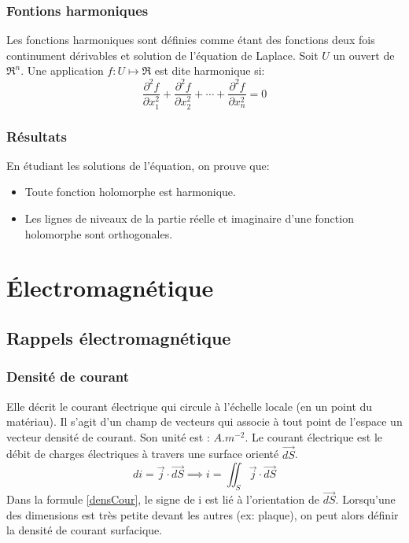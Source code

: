 \documentclass[10pt,a4paper]{article}
\begin{document}
\subsubsection{Fontions harmoniques \cite{fharmonique}}
Les fonctions harmoniques sont définies comme étant des fonctions deux fois continument dérivables et solution de l'équation de Laplace. Soit $U$ un ouvert de $\Re^{n}$. Une application $f : U \mapsto \Re$ est dite harmonique si:
\begin{equation}
\frac{\partial^{2} f}{\partial x_{1}^{2}} + \frac{\partial^{2} f}{\partial x_{2}^{2}} + \dotsb + \frac{\partial^{2} f}{\partial x_{n}^{2}} = 0
\end{equation}

\subsubsection{Résultats}
En étudiant les solutions de l'équation, on prouve que:
\begin{itemize}
\item Toute fonction holomorphe\cite{fholomorphe} est harmonique.
\item Les lignes de niveaux\cite{ligneniveau} de la partie réelle et imaginaire d'une fonction holomorphe sont orthogonales.
\end{itemize}




\section{Électromagnétique}
\subsection{Rappels électromagnétique}

\subsubsection{Densité de courant \cite{denscour}}
Elle décrit le courant électrique qui circule à l'échelle locale (en un point du matériau). Il s'agit d'un champ de vecteurs qui associe à tout point de l'espace un vecteur densité de courant. Son unité est : $A.m^{-2}$. Le courant électrique est le débit de charges électriques à travers une surface orienté $\overrightarrow{dS}$.
\begin{equation}
di = \overrightarrow{j}\cdot\overrightarrow{dS} \implies i = \iint_{S}\overrightarrow{j}\cdot\overrightarrow{dS}
\label{densCour}
\end{equation}
Dans la formule \ref{densCour}, le signe de i est lié à l'orientation de $\overrightarrow{dS}$.
Lorsqu'une des dimensions est très petite devant les autres (ex: plaque), on peut alors définir la densité de courant surfacique.
\end{document}
